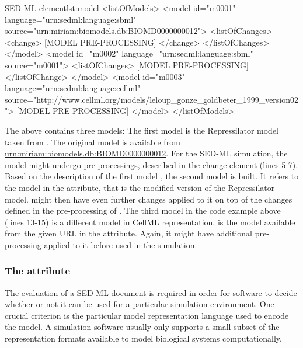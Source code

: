 %
\begin{myXmlLst}{SED-ML  element}{lst:model}
<listOfModels>
 <model id="m0001" language="urn:sedml:language:sbml" 
  source="urn:miriam:biomodels.db:BIOMD0000000012">
  <listOfChanges>
   <change>
    [MODEL PRE-PROCESSING]
   </change>
   </listOfChanges> 
 </model>
 <model id="m0002" language="urn:sedml:language:sbml" source="m0001">
  <listOfChanges>
   [MODEL PRE-PROCESSING]
  </listOfChange>
 </model>
 <model id="m0003" language="urn:sedml:language:cellml" source="http://www.cellml.org/models/leloup_gonze_goldbeter_1999_version02">
  [MODEL PRE-PROCESSING]
 </model>
</listOfModels>
\end{myXmlLst} 
%

The above  contains three models: 
The first model  is the Repressilator model taken from \biom. 
The original model is available from \url{urn:miriam:biomodels.db:BIOMD0000000012}. 
For the SED-ML simulation, the model might undergo pre-processings, described in the \hyperref[class:change]{change} element (lines 5-7).
Based on the description of the first model , the second model is built. 
It refers to the model  in the  attribute, that is the modified version of the Repressilator model.
 might then have even further changes applied to it on top of the changes defined in the pre-processing of .
The third model in the code example above (lines 13-15) is a different model in CellML representation.  is the model available from the given URL in the  attribute. Again, it might have additional pre-processing applied to it before used in the simulation.


\subsubsection{The  attribute}
\label{sec:language}
The evaluation of a SED-ML document is required in order for software to decide whether or not it can be used for a particular simulation environment. One crucial criterion is the particular model representation language used to encode the model. A simulation software usually only supports a small subset of the representation formats available to model biological systems computationally. 

